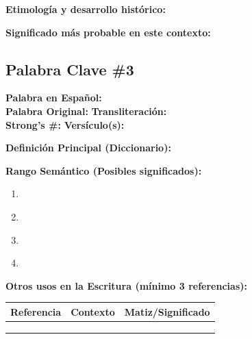 \documentclass[11pt,a4paper]{article}
\begin{document}
\vspace{0.5cm}

\textbf{Etimología y desarrollo histórico:}
\vspace{2cm}

\textbf{Significado más probable en este contexto:}
\vspace{2cm}

\newpage

\subsection{Palabra Clave \#3}

\begin{lexiconbox}
\textbf{Palabra en Español:} \underline{\hspace{8cm}}\\[0.5cm]
\textbf{Palabra Original:} \underline{\hspace{4cm}} \quad \textbf{Transliteración:} \underline{\hspace{4cm}}\\[0.5cm]
\textbf{Strong's \#:} \underline{\hspace{3cm}} \quad \textbf{Versículo(s):} \underline{\hspace{5cm}}
\end{lexiconbox}

\textbf{Definición Principal (Diccionario):}
\vspace{2cm}

\textbf{Rango Semántico (Posibles significados):}
\begin{enumerate}[leftmargin=1cm]
    \item \underline{\hspace{12cm}}
    \item \underline{\hspace{12cm}}
    \item \underline{\hspace{12cm}}
    \item \underline{\hspace{12cm}}
\end{enumerate}

\textbf{Otros usos en la Escritura (mínimo 3 referencias):}

\vspace{0.5cm}

\begin{tabularx}{\textwidth}{|L{2.5cm}|L{5.5cm}|X|}
\hline
\textbf{Referencia} & \textbf{Contexto} & \textbf{Matiz/Significado} \\
\hline
\vspace{1.5cm} & \vspace{1.5cm} & \vspace{1.5cm} \\
\hline
\vspace{1.5cm} & \vspace{1.5cm} & \vspace{1.5cm} \\
\hline
\vspace{1.5cm} & \vspace{1.5cm} & \vspace{1.5cm} \\
\hline
\end{tabularx}
\end{document}
